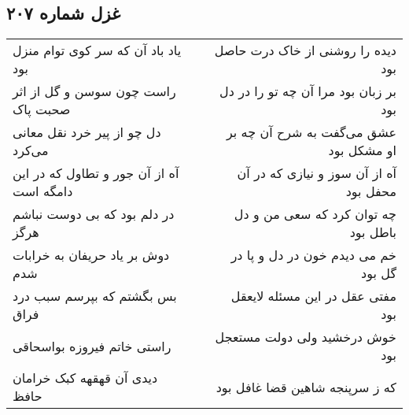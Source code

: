 \begin{center}
\section*{غزل شماره ۲۰۷}
\label{sec:sh207}
\begin{longtable}{l p{0.5cm} r}
یاد باد آن که سر کوی توام منزل بود
&&
دیده را روشنی از خاک درت حاصل بود
\\
راست چون سوسن و گل از اثر صحبت پاک
&&
بر زبان بود مرا آن چه تو را در دل بود
\\
دل چو از پیر خرد نقل معانی می‌کرد
&&
عشق می‌گفت به شرح آن چه بر او مشکل بود
\\
آه از آن جور و تطاول که در این دامگه است
&&
آه از آن سوز و نیازی که در آن محفل بود
\\
در دلم بود که بی دوست نباشم هرگز
&&
چه توان کرد که سعی من و دل باطل بود
\\
دوش بر یاد حریفان به خرابات شدم
&&
خم می دیدم خون در دل و پا در گل بود
\\
بس بگشتم که بپرسم سبب درد فراق
&&
مفتی عقل در این مسئله لایعقل بود
\\
راستی خاتم فیروزه بواسحاقی
&&
خوش درخشید ولی دولت مستعجل بود
\\
دیدی آن قهقهه کبک خرامان حافظ
&&
که ز سرپنجه شاهین قضا غافل بود
\\
\end{longtable}
\end{center}
